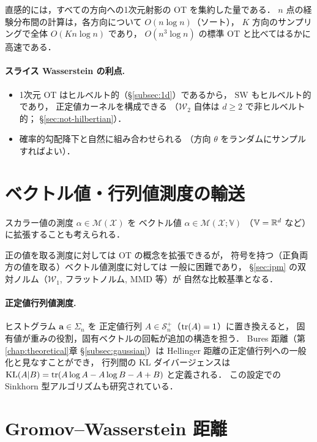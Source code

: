 直感的には，すべての方向への1次元射影の OT を集約した量である．
$n$ 点の経験分布間の計算は，各方向について $O(n \log n)$（ソート），
$K$ 方向のサンプリングで全体 $O(Kn \log n)$ であり，
$O(n^3 \log n)$ の標準 OT と比べてはるかに高速である．

\paragraph{スライス Wasserstein の利点.}
\begin{itemize}
  \item 1次元 OT はヒルベルト的（§\ref{subsec:1d}）であるから，
    $\mathrm{SW}$ もヒルベルト的であり，
    正定値カーネルを構成できる
    （$\mathcal{W}_2$ 自体は $d \geq 2$ で非ヒルベルト的；
    §\ref{sec:not-hilbertian}）．
  \item 確率的勾配降下と自然に組み合わせられる
    （方向 $\theta$ をランダムにサンプルすればよい）．
\end{itemize}


\section{ベクトル値・行列値測度の輸送}\label{sec:vector-matrix}

スカラー値の測度 $\alpha \in \mathcal{M}(\mathcal{X})$ を
ベクトル値 $\alpha \in \mathcal{M}(\mathcal{X}; \mathbb{V})$
（$\mathbb{V} = \mathbb{R}^d$ など）に拡張することも考えられる．

正の値を取る測度に対しては OT の概念を拡張できるが，
符号を持つ（正負両方の値を取る）ベクトル値測度に対しては
一般に困難であり，
§\ref{sec:ipm} の双対ノルム（$\mathcal{W}_1$, フラットノルム, MMD 等）が
自然な比較基準となる．

\paragraph{正定値行列値測度.}
ヒストグラム $\mathbf{a} \in \Sigma_n$ を
正定値行列 $A \in \mathcal{S}^+_n$（$\operatorname{tr}(A) = 1$）に置き換えると，
固有値が重みの役割，固有ベクトルの回転が追加の構造を担う．
Bures 距離（第\ref{chap:theoretical}章 §\ref{subsec:gaussian}）は
Hellinger 距離の正定値行列への一般化と見なすことができ，
行列間の KL ダイバージェンスは
$\operatorname{KL}(A|B) = \operatorname{tr}(A \log A - A \log B - A + B)$
と定義される．
この設定での Sinkhorn 型アルゴリズムも研究されている．


\section{Gromov--Wasserstein 距離}\label{sec:gromov-wasserstein}

